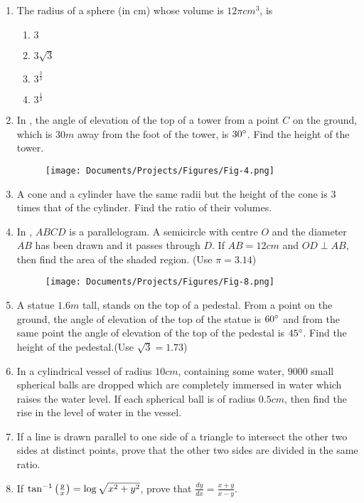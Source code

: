 \begin{enumerate}
\item The radius of a sphere (in cm) whose volume is $12\pi cm^3$, is
\begin{enumerate}
\item $3$
\item $3 \sqrt{3}$
\item $3^\frac{2}{3}$
\item $3^\frac{1}{3}$
\end{enumerate}
\item In , the angle of elevation of the top of a tower from a point $C$ on the ground, which is $30m$ away from the foot of the tower, is $30\degree$. Find the height of the tower.      
\begin{figure}[H]
\centering
\texttt{[image: Documents/Projects/Figures/Fig-4.png]}
\caption{}      
\label{fig:Fig-4.png}
\end{figure}
\item A cone and a cylinder have the same radii but the height of the cone is $3$ times that of the cylinder. Find the ratio of their volumes.
\item In , $ABCD$ is a parallelogram. A semicircle with centre $O$ and the diameter $AB$ has been drawn and it passes through $D$. If $AB=12cm$ and $OD \perp AB$, then find the area of the shaded region. (Use $\pi=3.14$)
\begin{figure}[H]
\centering
\texttt{[image: Documents/Projects/Figures/Fig-8.png]}
\caption{}
\label{fig:Fig-8.png}
\end{figure}
\item A statue $1.6m$ tall, stands on the top of a pedestal. From a point on the ground, the angle of elevation of the top of the statue is $60\degree$ and from the same point the angle of elevation of the top of the pedestal is $45\degree$. Find the height of the pedestal.(Use $\sqrt{3}=1.73$)
\item In a cylindrical vessel of radius $10 cm$, containing some water, $9000$ small spherical balls are dropped which are completely immersed in water which raises the water level. If each spherical ball is of radius $0.5 cm$, then find the rise in the level of water in the vessel.
\item If a line is drawn parallel to one side of a triangle to intersect the other two sides at distinct points, prove that the other two sides are divided in the same ratio.
\item If $\tan^{-1}\left(\frac{y}{x}\right)=\log\sqrt{x^2+y^2}$, prove that $\frac{dy}{dx}=\frac{x+y}{x-y}$.
\end{enumerate}